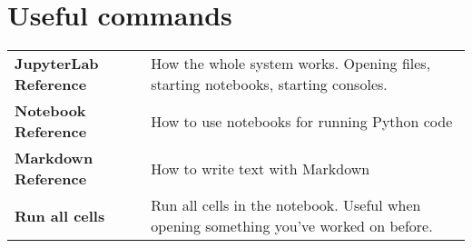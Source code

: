 \documentclass[11pt]{article}
\begin{document}
\section{Useful commands}
\label{sec:org34d46e0}
\begin{center}
\begin{tabular}{ll}
\textbf{JupyterLab Reference} & How the whole system works. Opening files, starting notebooks, starting consoles.\\
\textbf{Notebook Reference} & How to use notebooks for running Python code\\
\textbf{Markdown Reference} & How to write text with Markdown\\
\textbf{Run all cells} & Run all cells in the notebook. Useful when opening something you've worked on before.\\
\end{tabular}
\end{center}
\end{document}
